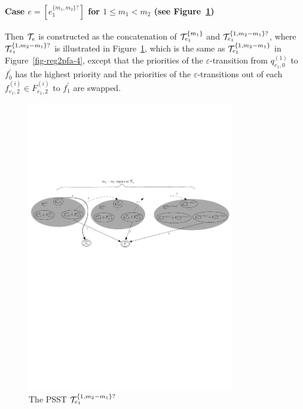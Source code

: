 \paragraph{Case $e = [e_1^{\{m_1,m_2\}?}]$ for $1 \le m_1 < m_2$ (see Figure~\ref{fig-reg2pfa-5})} Then $\mathcal{T}_e$ is constructed as the concatenation of $\mathcal{T}^{\{m_1\}}_{e_1}$ and $\mathcal{T}^{\{1,m_2-m_1\}?}_{e_1}$, where $\mathcal{T}^{\{1,m_2-m_1\}?}_{e_1}$ is illustrated in Figure~\ref{fig-reg2pfa-5}, which is the same as $\mathcal{T}^{\{1,m_2-m_1\}}_{e_1}$ in Figure~\ref{fig-reg2pfa-4}, except that the priorities of the $\varepsilon$-transition from $q^{(1)}_{e_1,0}$ to $f^\prime_0$ has the highest priority and  the priorities of the $\varepsilon$-transitions out of each $f^{(i)}_{e_1,2} \in F^{(i)}_{e_1,2}$ to $f^\prime_1$ are swapped.
		\begin{figure}[ht]
			\centering
			\includegraphics[width = 0.8\textwidth]{reg2pfa-5.pdf}
			\caption{The PSST $\mathcal{T}^{\{1,m_2-m_1\}?}_{e_1}$}
			\label{fig-reg2pfa-5}
		\end{figure}  

